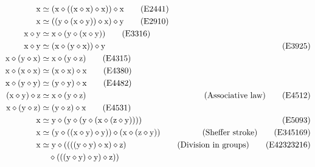     \begin{align}
        \x &\formaleq (\x \op ((\x \op \x) \op \x)) \op \x \label{eq2441}\tag{E2441} \\
        \x &\formaleq ((\y \op (\x \op \y)) \op \x) \op \y \label{eq2910}\tag{E2910} \\
        \x \op \y &\formaleq \x \op (\y \op (\x \op \y)) \label{eq3316}\tag{E3316} \\
        \x \op \y &\formaleq (\x \op (\y \op \x)) \op \y & \label{eq3925}\tag{E3925} \\
        \x \op (\y \op \x) &\formaleq \x \op (\y \op \z) \label{eq4315}\tag{E4315} \\
        \x \op (\x \op \x) &\formaleq (\x \op \x) \op \x \label{eq4380}\tag{E4380} \\
        \x \op (\y \op \y) &\formaleq (\y \op \y) \op \x \label{eq4482}\tag{E4482} \\
        (\x \op \y) \op \z &\formaleq \x \op (\y \op \z) &\hbox{(Associative law)} \label{eq4512}\tag{E4512}\\
        \x \op (\y \op \z) &\formaleq (\y \op \z) \op \x \label{eq4531}\tag{E4531} \\
        \x &\formaleq \y \op (\y \op (\y \op (\x \op (\z \op \y)))) &  \label{eq5093}\tag{E5093} \\
        \x &\formaleq (\y \op ((\x \op \y) \op \y)) \op (\x \op (\z \op \y)) & \hbox{(Sheffer stroke)} \label{eq345169}\tag{E345169} \\
        \x &\formaleq \y \op ((((\y \op \y) \op \x) \op \z) & \hbox{(Division in groups)} \label{eq42323216}\tag{E42323216} \\
        & \quad  \op (((\y \op \y) \op \y) \op \z)) \nonumber
\end{align}
